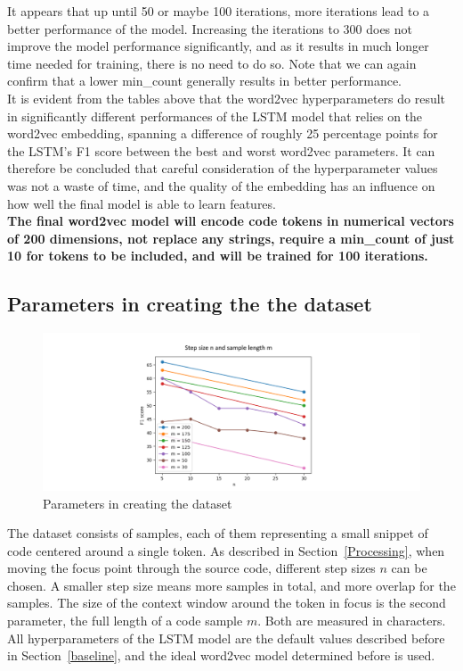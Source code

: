 \documentclass[
a4paper,
pagesize,
pdftex,
12pt,
twoside, %
BCOR=5mm, %
ngerman,
fleqn,
final,
]{scrartcl}
\begin{document}
	It appears that up until 50 or maybe 100 iterations, more iterations lead to a better performance of the model. Increasing the iterations to 300 does not improve the model performance significantly, and as it results in much longer time needed for training, there is no need to do so. Note that we can again confirm that a lower min\_count generally results in better performance.\\
	It is evident from the tables above that the word2vec hyperparameters do result in significantly different performances of the LSTM model that relies on the word2vec embedding, spanning a difference of roughly 25 percentage points for the LSTM's F1 score between the best and worst word2vec parameters. It can therefore be concluded that careful consideration of the hyperparameter values was not a waste of time, and the quality of the embedding has an influence on how well the final model is able to learn features.\\
	
	\textbf{The final word2vec model will encode code tokens in numerical vectors of 200 dimensions, not replace any strings, require a min\_count of just 10 for tokens to be included, and will be trained for 100 iterations.}\\
	
	
	\subsection{Parameters in creating the the dataset}
	
	\begin{figure}[H]
		\centering
		\includegraphics[width=1\textwidth]{img/parametersmn}
		\caption{Parameters in creating the dataset}
		\label{fig:mn}
	\end{figure}
	The dataset consists of samples, each of them representing a small snippet of code centered around a single token. As described in Section~\ref{Processing}, when moving the focus point through the source code, different step sizes $n$ can be chosen. A smaller step size means more samples in total, and more overlap for the samples. The size of the context window around the token in focus is the second parameter, the full length of a code sample $m$. Both are measured in characters. All  hyperparameters of the LSTM model are the default values described before in Section~\ref{baseline}, and the ideal word2vec model determined before is used.
	
\end{document}
